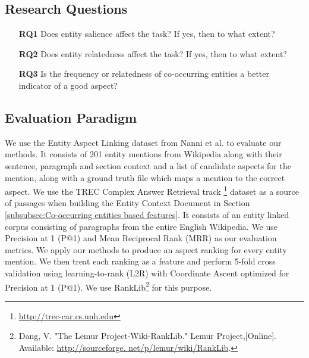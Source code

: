 \documentclass[sigconf,authordraft]{acmart}
\begin{document}
\subsection{Research Questions}
\label{subsec:Research Questions}

\begin{itemize}
\item[\textbf{RQ1}] Does entity salience affect the task? If yes, then to what extent?
\item[\textbf{RQ2}] Does entity relatedness affect the task? If yes, then to what extent? 
\item[\textbf{RQ3}] Is the frequency or relatedness of co-occurring entities a better indicator of a good aspect?
\end{itemize}

\subsection{Evaluation Paradigm}
\label{subsec:Evaluation Paradigm}

We use the Entity Aspect Linking dataset from Nanni et al.\cite{nanni2018entity} to evaluate our methods. It consists of 201 entity mentions from Wikipedia along with their sentence, paragraph and section context and a list of candidate aspects for the mention, along with a ground truth file which maps a mention to the correct aspect.  We use the TREC Complex Answer Retrieval track \cite{dietz2018trec}\footnote{\url{http://trec-car.cs.unh.edu}} dataset as a source of passages when building the Entity Context Document in Section \ref{subsubsec:Co-occurring entities based features}. It consists of an entity linked corpus consisting of paragraphs from the entire English Wikipedia. We use Precision at 1 (P@1) and Mean Reciprocal Rank (MRR) as our evaluation metrics. We apply our methods to produce an aspect ranking for every entity mention. We then treat each ranking as a feature and perform 5-fold cross validation using learning-to-rank (L2R) with Coordinate Ascent optimized for Precision at 1 (P@1). We use RankLib\footnote{Dang, V. "The Lemur Project-Wiki-RankLib." Lemur Project,[Online]. Available: \url{http://sourceforge. net/p/lemur/wiki/RankLib}.} for this purpose. 
\end{document}
